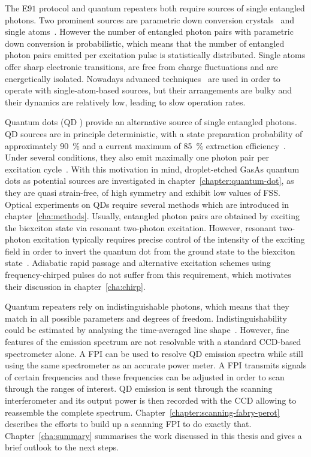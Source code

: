 The E$91$ protocol and quantum repeaters both require sources of single entangled photons.
Two prominent sources are parametric down conversion crystals~\cite{shih_new_1988} and single atoms~\cite{norden_entangled_2018}\cite{aspect_experimental_1981}.
However the number of entangled photon pairs with parametric down conversion is probabilistic, which means that the number of entangled photon pairs emitted per excitation pulse is statistically distributed.
Single atoms offer sharp electronic transitions, are free from charge fluctuations and are energetically isolated.
Nowadays advanced techniques~\cite{kuhn_deterministic_2002} are used in order to operate with single-atom-based sources, but their arrangements are bulky and their dynamics are relatively low, leading to slow operation rates.

Quantum dots (\acs{QD} ) provide an alternative source of single entangled photons.
\ac{QD} sources are in principle deterministic, with a state preparation probability of approximately \SI{90}{\percent} and a current maximum of \SI{85}{\percent} extraction efficiency~\cite{liu_solid-state_2019}.
Under several conditions, they also emit maximally one photon pair per excitation cycle~\cite{schweickert_-demand_2018}.
With this motivation in mind, droplet-etched GasAs quantum dots as potential sources are investigated in chapter~\ref{chapter:quantum-dot}, as they are quasi strain-free, of high symmetry and exhibit low values of \ac{FSS}.
Optical experiments on \acp{QD} require several methods which are introduced in chapter~\ref{cha:methods}. 
Usually, entangled photon pairs are obtained by exciting the biexciton state via resonant two-photon excitation.
However, resonant two-photon excitation typically requires precise control of the intensity of the exciting field in order to invert the quantum dot from the ground state to the biexciton state~\cite{jayakumar_deterministic_2013}.
Adiabatic rapid passage and alternative excitation schemes using frequency-chirped pulses do not suffer from this requirement, which motivates their discussion in chapter~\ref{cha:chirp}.

Quantum repeaters rely on indistinguishable photons, which means that they match in all possible parameters and degrees of freedom.
Indistinguishability could be estimated by analysing the time-averaged line shape~\cite{reindl_all-photonic_2018}. However, fine features of the emission spectrum are not resolvable with a standard CCD-based spectrometer alone.
A \ac{FPI} can be used to resolve \ac{QD} emission spectra while still using the same spectrometer as an accurate power meter.
A \ac{FPI} transmits signals of certain frequencies and these frequencies can be adjusted in order to scan through the ranges of interest.
\ac{QD} emission is sent through the scanning interferometer and its output power is then recorded with the CCD allowing to reassemble the complete spectrum.
Chapter~\ref{chapter:scanning-fabry-perot} describes the efforts to build up a scanning \ac{FPI} to do exactly that.
Chapter~\ref{cha:summary} summarises the work discussed in this thesis and gives a brief outlook to the next steps.

